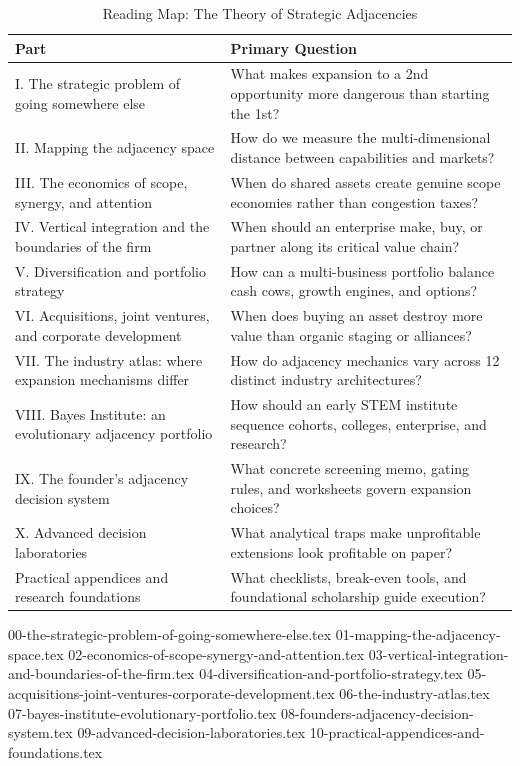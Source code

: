 \begin{table}[t]
\centering
\small
\caption{Reading Map: The Theory of Strategic Adjacencies}
\label{tab:ch29_reading_map}
\begin{tabularx}{\textwidth}{l X}
\toprule
\textbf{Part} & \textbf{Primary Question} \\
\midrule
I. The strategic problem of going somewhere else & What makes expansion to a 2nd opportunity more dangerous than starting the 1st? \\
II. Mapping the adjacency space & How do we measure the multi-dimensional distance between capabilities and markets? \\
III. The economics of scope, synergy, and attention & When do shared assets create genuine scope economies rather than congestion taxes? \\
IV. Vertical integration and the boundaries of the firm & When should an enterprise make, buy, or partner along its critical value chain? \\
V. Diversification and portfolio strategy & How can a multi-business portfolio balance cash cows, growth engines, and options? \\
VI. Acquisitions, joint ventures, and corporate development & When does buying an asset destroy more value than organic staging or alliances? \\
VII. The industry atlas: where expansion mechanisms differ & How do adjacency mechanics vary across 12 distinct industry architectures? \\
VIII. Bayes Institute: an evolutionary adjacency portfolio & How should an early STEM institute sequence cohorts, colleges, enterprise, and research? \\
IX. The founder's adjacency decision system & What concrete screening memo, gating rules, and worksheets govern expansion choices? \\
X. Advanced decision laboratories & What analytical traps make unprofitable extensions look profitable on paper? \\
Practical appendices and research foundations & What checklists, break-even tools, and foundational scholarship guide execution? \\
\bottomrule
\end{tabularx}
\end{table}

{00-the-strategic-problem-of-going-somewhere-else.tex}
{01-mapping-the-adjacency-space.tex}
{02-economics-of-scope-synergy-and-attention.tex}
{03-vertical-integration-and-boundaries-of-the-firm.tex}
{04-diversification-and-portfolio-strategy.tex}
{05-acquisitions-joint-ventures-corporate-development.tex}
{06-the-industry-atlas.tex}
{07-bayes-institute-evolutionary-portfolio.tex}
{08-founders-adjacency-decision-system.tex}
{09-advanced-decision-laboratories.tex}
{10-practical-appendices-and-foundations.tex}
